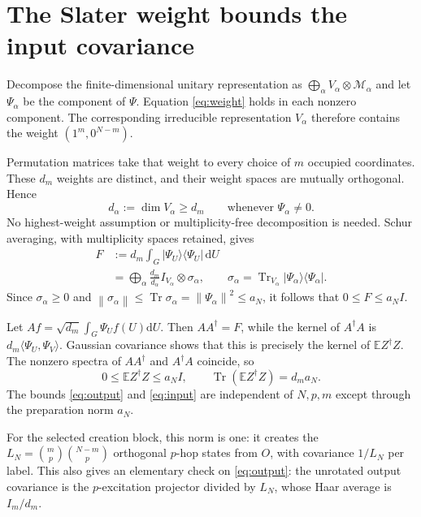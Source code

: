 \documentclass[11pt]{article}
\newcommand{\E}{\mathbb E}
\newcommand{\Tr}{\operatorname{Tr}}
\newcommand{\dd}{\mathrm d}
\newcommand{\norm}[1]{\left\lVert#1\right\rVert}
\begin{document}
\newpage
\section{The Slater weight bounds the input covariance}
Decompose the finite-dimensional unitary representation as
$\bigoplus_\alpha V_\alpha\otimes\mathcal M_\alpha$ and let
$\Psi_\alpha$ be the component of $\Psi$. Equation \eqref{eq:weight}
holds in each nonzero component. The corresponding irreducible
representation $V_\alpha$ therefore contains the weight
$(1^m,0^{N-m})$.

Permutation matrices take that weight to every choice of $m$ occupied
coordinates. These $d_m$ weights are distinct, and their weight
spaces are mutually orthogonal. Hence
\begin{equation}
 d_\alpha:=\dim V_\alpha\ge d_m
 \qquad\text{whenever }\Psi_\alpha\ne0.
\end{equation}
No highest-weight assumption or multiplicity-free decomposition is
needed. Schur averaging, with multiplicity spaces retained, gives
\begin{align}
 F&:=d_m\int_G|\Psi_U\rangle\langle\Psi_U|\,\dd U\\
 &=\bigoplus_\alpha\frac{d_m}{d_\alpha}I_{V_\alpha}
       \otimes\sigma_\alpha,\qquad
 \sigma_\alpha=\Tr_{V_\alpha}
                   |\Psi_\alpha\rangle\langle\Psi_\alpha|.
\end{align}
Since $\sigma_\alpha\ge0$ and
$\norm{\sigma_\alpha}\le\Tr\sigma_\alpha
=\norm{\Psi_\alpha}^2\le a_N$, it follows that $0\le F\le a_N I$.

Let $Af=\sqrt{d_m}\int_G\Psi_U f(U)\dd U$.
Then $AA^\dagger=F$, while the kernel of $A^\dagger A$ is
$d_m\langle\Psi_U,\Psi_V\rangle$.
Gaussian covariance shows that this is precisely the kernel of
$\E Z^\dagger Z$. The nonzero spectra of $AA^\dagger$ and
$A^\dagger A$ coincide, so
\begin{equation}\label{eq:input}
 0\le\E Z^\dagger Z\le a_N I,
 \qquad \Tr(\E Z^\dagger Z)=d_m a_N.
\end{equation}
The bounds \eqref{eq:output} and \eqref{eq:input} are independent of
$N,p,m$ except through the preparation norm $a_N$.

For the selected creation block, this norm is one: it creates the
$L_N=\binom mp\binom{N-m}p$ orthogonal $p$-hop states from $O$,
with covariance $1/L_N$ per label. This also gives an elementary
check on \eqref{eq:output}: the unrotated output covariance is the
$p$-excitation projector divided by $L_N$, whose Haar average is
$I_m/d_m$.
\end{document}
